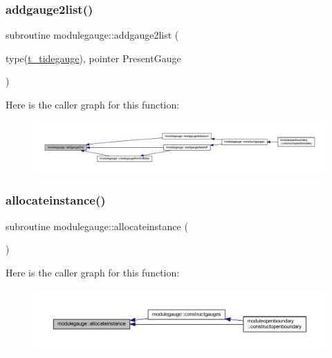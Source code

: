 \subsubsection{\texorpdfstring{addgauge2list()}{addgauge2list()}}
{\footnotesize\ttfamily subroutine modulegauge\+::addgauge2list (\begin{DoxyParamCaption}\item[{type(\mbox{\hyperlink{structmodulegauge_1_1t__tidegauge}{t\+\_\+tidegauge}}), pointer}]{Present\+Gauge }\end{DoxyParamCaption})\hspace{0.3cm}{\ttfamily [private]}}

Here is the caller graph for this function\+:\nopagebreak
\begin{figure}[H]
\begin{center}
\leavevmode
\includegraphics[width=350pt]{namespacemodulegauge_a672a5d3f45d4bf6b413012a0705ca328_icgraph}
\end{center}
\end{figure}
\mbox{\label{namespacemodulegauge_a1aea609b0bda24026589e2d67bf3e0ab}} 
\subsubsection{\texorpdfstring{allocateinstance()}{allocateinstance()}}
{\footnotesize\ttfamily subroutine modulegauge\+::allocateinstance (\begin{DoxyParamCaption}{ }\end{DoxyParamCaption})\hspace{0.3cm}{\ttfamily [private]}}

Here is the caller graph for this function\+:\nopagebreak
\begin{figure}[H]
\begin{center}
\leavevmode
\includegraphics[width=350pt]{namespacemodulegauge_a1aea609b0bda24026589e2d67bf3e0ab_icgraph}
\end{center}
\end{figure}
\mbox{\label{namespacemodulegauge_adb09b4f645d53ae4da6e979cbda1d5ea}} 
